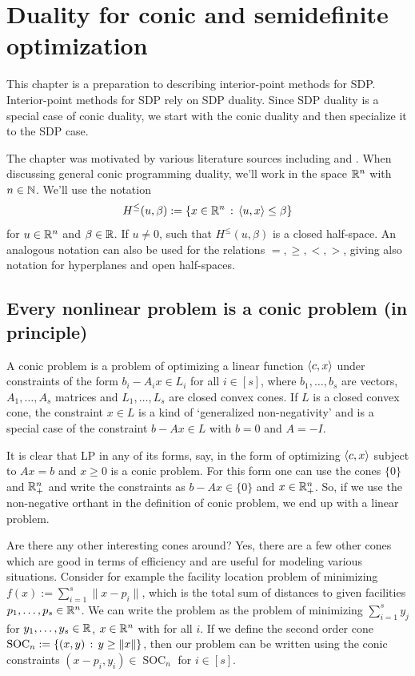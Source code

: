 
\section{Duality for conic and semidefinite optimization}

\label{conic:optimization}

This chapter is a preparation to describing interior-point methods for SDP. Interior-point methods for SDP rely on SDP duality. Since SDP duality is a special case of conic duality, we start with the conic duality and then specialize it to the SDP case.  

The chapter was motivated by various literature sources including \cite{Laurent:Vallentin:2012} and \cite[Chapter~4]{Gaertner:Matousek:2012}. When discussing general conic programming duality, we'll work in the space $\mathbb{R}^n$ with $n \in \mathbb{N}$. We'll use the notation 
\[
	H^\le(u,\beta) := \left\{  x \in \mathbb{R}^n \,:\,  \left\langle u , x \right\rangle \le \beta \right\}
\]
for $u \in \mathbb{R}^n$ and $\beta \in \mathbb{R}$. If $u \ne 0$, such that $H^\le(u,\beta)$ is a closed half-space. An analogous notation can also be used for the relations $=,\ge,<,>$, giving also notation for hyperplanes and open half-spaces.

\subsection{Every nonlinear problem is a conic problem (in principle)}

\newcommand{\SOC}{\operatorname{SOC}}

A conic problem is a problem of optimizing a linear function $\left\langle c , x \right\rangle$ under constraints of the form $b_i - A_i x \in L_i$ for all $i \in [s]$, where $b_1,\ldots,b_s$ are vectors, $A_1,\ldots,A_s$ matrices and $L_1,\ldots,L_s$ are closed convex cones. If $L$ is a closed convex cone, the constraint $x \in L$ is a kind of `generalized non-negativity' and is a special case of the constraint $b - A x \in L$ with $b=0$ and $A = -I$. 

It is clear that LP in any of its forms, say, in the form of optimizing $\left\langle c , x \right\rangle$ subject to $A x = b$ and $x \ge 0$ is a conic problem. For this form one can use the cones $\{0\}$ and $\mathbb{R}_+^n$ and write the constraints as $b- A x \in \{0\}$ and $x \in \mathbb{R}_+^n$. So, if we use the non-negative orthant in the definition of conic problem, we end up with a linear problem. 

Are there any other interesting cones around? Yes, there are a few other cones which are good in terms of efficiency and are useful for modeling various situations. Consider for example the facility location problem of minimizing $f(x) := \sum_{i=1}^s \|x- p_i\|$, which is the total sum of distances to given facilities $p_1, \ldots,p_s \in \mathbb{R}^n$. We can write the problem as the problem of minimizing $\sum_{i=1}^s y_j$ for $y_1,\ldots,y_s \in \mathbb{R}$, $x \in \mathbb{R}^n$ with  for all $i$. If we define the second order cone $\SOC_n:=\setcond{(x,y)}{y \ge \|x\|}$, then our problem can be written using the conic constraints $(x - p_i,y_i) \in \SOC_n$ for $i \in [s]$. 

